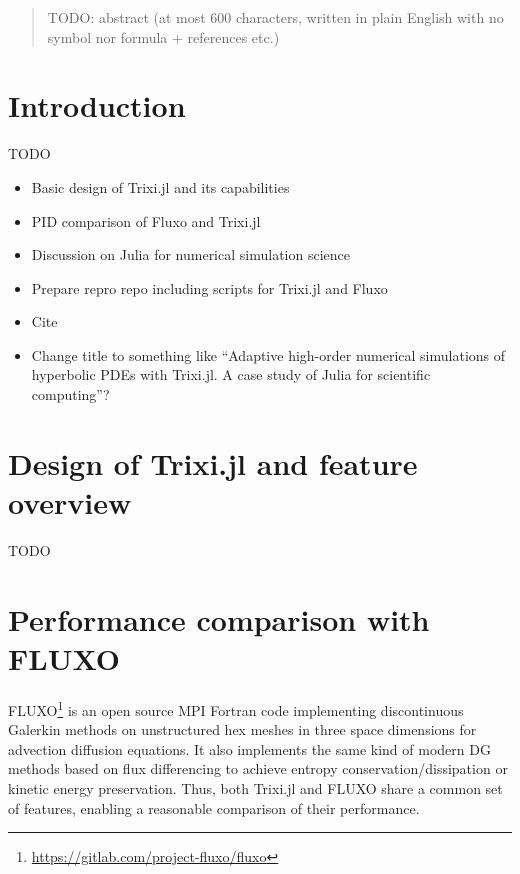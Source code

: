 \documentclass{juliacon}
\begin{document}


\maketitle

\begin{abstract}
TODO: abstract (at most 600 characters, written in plain English with no symbol
nor formula + references etc.) %
\end{abstract}


\section{Introduction}

TODO %
\begin{itemize}
  \item Basic design of Trixi.jl and its capabilities
  \item PID comparison of Fluxo and Trixi.jl
  \item Discussion on Julia for numerical simulation science
  \item Prepare repro repo including scripts for Trixi.jl and Fluxo
  \item Cite \cite{bezanson2017julia,schlottkelakemper2021purely,rackauckas2017differentialequations,revels2016forward}
  \item Change title to something like ``Adaptive high-order numerical simulations
  of hyperbolic PDEs with Trixi.jl. A case study of Julia for scientific computing''?
\end{itemize}


\section{Design of Trixi.jl and feature overview}

TODO %


\section{Performance comparison with FLUXO}

FLUXO\footnote{\url{https://gitlab.com/project-fluxo/fluxo}} is an open source
MPI Fortran code implementing discontinuous Galerkin methods on unstructured hex
meshes in three space dimensions for advection diffusion equations. It also
implements the same kind of modern DG methods based on flux differencing
to achieve entropy conservation/dissipation or kinetic energy preservation.
Thus, both Trixi.jl and FLUXO share a common set of features, enabling a reasonable
comparison of their performance.
\end{document}
